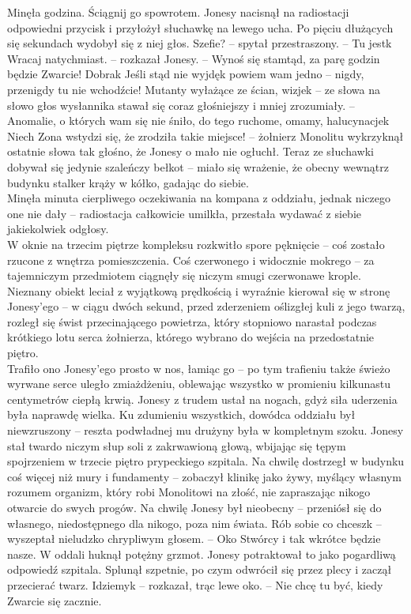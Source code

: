 \documentclass[../MAIN.tex]{subfiles}
\begin{document}
\sx Minęła godzina. Ściągnij go spowrotem.
\qd
Jonesy nacisnął na radiostacji odpowiedni przycisk i przyłożył słuchawkę na lewego ucha. Po pięciu dłużących się sekundach wydobył się z niej głos.
\sx Szefie? -- spytał przestraszony. -- Tu jest\3k
\xx Wracaj natychmiast. -- rozkazał Jonesy. -- Wynoś się stamtąd, za parę godzin będzie Zwarcie!
\xx Dobra\3k Jeśli stąd nie wyjdę\3k powiem wam jedno -- nigdy, przenigdy tu nie wchodźcie! Mutanty wyłażące ze ścian, wizje\3k -- ze słowa na słowo głos wysłannika stawał się coraz głośniejszy i mniej zrozumiały. -- Anomalie, o których wam się nie śniło, do tego ruchome, omamy, halucynacje\3k Niech Zona wstydzi się, że zrodziła takie miejsce! -- żołnierz Monolitu wykrzyknął ostatnie słowa tak głośno, że Jonesy o mało nie ogłuchł. 
\qd
Teraz ze słuchawki dobywał się jedynie szaleńczy bełkot -- miało się wrażenie, że obecny wewnątrz budynku stalker krąży w kółko, gadając do siebie.\\
Minęła minuta cierpliwego oczekiwania na kompana z oddziału, jednak niczego one nie dały -- radiostacja całkowicie umilkła, przestała wydawać z siebie jakiekolwiek odgłosy.\\
W oknie na trzecim piętrze kompleksu rozkwitło spore pęknięcie -- coś zostało rzucone z wnętrza pomieszczenia. Coś czerwonego i widocznie mokrego -- za tajemniczym przedmiotem ciągnęły się niczym smugi czerwonawe krople. Nieznany obiekt leciał z wyjątkową prędkością i wyraźnie kierował się w stronę Jonesy’ego -- w ciągu dwóch sekund, przed zderzeniem oślizgłej kuli z jego twarzą, rozległ się świst przecinającego powietrza, który stopniowo narastał podczas krótkiego lotu serca żołnierza, którego wybrano do wejścia na przedostatnie piętro.\\
Trafiło ono Jonesy’ego prosto w nos, łamiąc go -- po tym trafieniu także świeżo wyrwane serce uległo zmiażdżeniu, oblewając wszystko w promieniu kilkunastu centymetrów ciepłą krwią. Jonesy z trudem ustał na nogach, gdyż siła uderzenia była naprawdę wielka. Ku zdumieniu wszystkich, dowódca oddziału był niewzruszony -- reszta podwładnej mu drużyny była w kompletnym szoku. Jonesy stał twardo niczym słup soli z zakrwawioną głową, wbijając się tępym spojrzeniem w trzecie piętro prypeckiego szpitala. Na chwilę dostrzegł w budynku coś więcej niż mury i fundamenty -- zobaczył klinikę jako żywy, myślący własnym rozumem organizm, który robi Monolitowi na złość, nie zapraszając nikogo otwarcie do swych progów. Na chwilę Jonesy był nieobecny -- przeniósł się do własnego, niedostępnego dla nikogo, poza nim świata.
\sx Rób sobie co chcesz\3k -- wyszeptał nieludzko chrypliwym głosem. -- Oko Stwórcy i tak wkrótce będzie nasze.
\qd
W oddali huknął potężny grzmot. Jonesy potraktował to jako pogardliwą odpowiedź szpitala. Splunął szpetnie, po czym odwrócił się przez plecy i zaczął przecierać twarz.
\sx Idziemy\3k -- rozkazał, trąc lewe oko. -- Nie chcę tu być, kiedy Zwarcie się zacznie.
\qd
\end{document}
